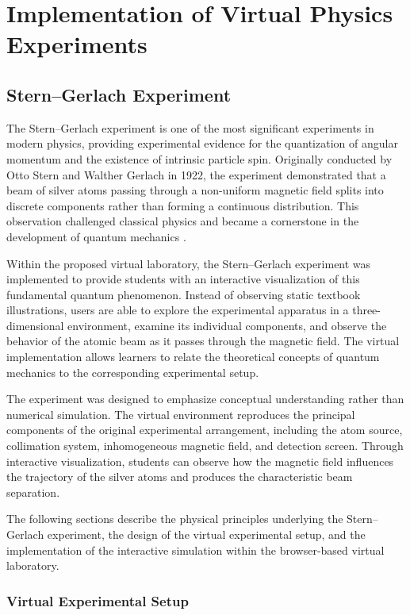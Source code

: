 \chapter{Implementation of Virtual Physics Experiments}

\section{Stern--Gerlach Experiment}

The Stern--Gerlach experiment is one of the most significant experiments in modern physics, providing experimental evidence for the quantization of angular momentum and the existence of intrinsic particle spin. Originally conducted by Otto Stern and Walther Gerlach in 1922, the experiment demonstrated that a beam of silver atoms passing through a non-uniform magnetic field splits into discrete components rather than forming a continuous distribution. This observation challenged classical physics and became a cornerstone in the development of quantum mechanics \cite{gerlach1922experiment,griffiths2018quantum}.

Within the proposed virtual laboratory, the Stern--Gerlach experiment was implemented to provide students with an interactive visualization of this fundamental quantum phenomenon. Instead of observing static textbook illustrations, users are able to explore the experimental apparatus in a three-dimensional environment, examine its individual components, and observe the behavior of the atomic beam as it passes through the magnetic field. The virtual implementation allows learners to relate the theoretical concepts of quantum mechanics to the corresponding experimental setup.

The experiment was designed to emphasize conceptual understanding rather than numerical simulation. The virtual environment reproduces the principal components of the original experimental arrangement, including the atom source, collimation system, inhomogeneous magnetic field, and detection screen. Through interactive visualization, students can observe how the magnetic field influences the trajectory of the silver atoms and produces the characteristic beam separation.

The following sections describe the physical principles underlying the Stern--Gerlach experiment, the design of the virtual experimental setup, and the implementation of the interactive simulation within the browser-based virtual laboratory.

\subsection{Virtual Experimental Setup}

